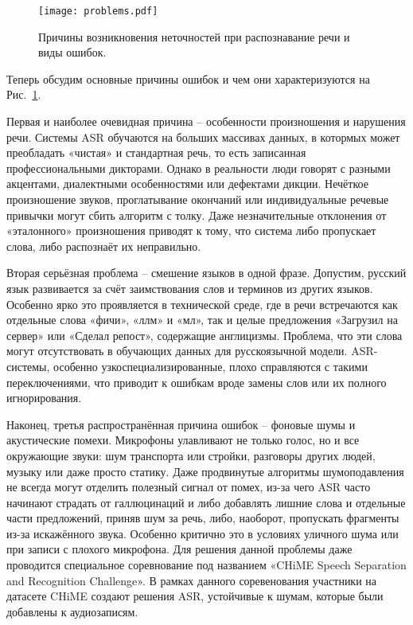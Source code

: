 \begin{figure}[!t]
  \centering
  \texttt{[image: problems.pdf]}
  \caption{Причины возникновения неточностей при распознавание речи и виды ошибок.}
  \label{fig:problems}
\end{figure}

Теперь обсудим основные причины ошибок и чем они характеризуются на Рис.~\ref{fig:problems}.

Первая и наиболее очевидная причина -- особенности произношения и нарушения речи.
Системы ASR обучаются на больших массивах данных, в котормых может преобладать «чистая» и стандартная речь, то есть записанная профессиональными дикторами.
Однако в реальности люди говорят с разными акцентами, диалектными особенностями или дефектами дикции.
Нечёткое произношение звуков, проглатывание окончаний или индивидуальные речевые привычки могут сбить алгоритм с толку.
Даже незначительные отклонения от «эталонного» произношения приводят к тому, что система либо пропускает слова, либо распознаёт их неправильно.

Вторая серьёзная проблема -- смешение языков в одной фразе.
Допустим, русский язык развивается за счёт заимствования слов и терминов из других языков.
Особенно ярко это проявляется в технической среде, где в речи встречаются как отдельные слова «фичи», «ллм» и «мл», так и целые предложения «Загрузил на сервер» или «Сделал репост», содержащие англицизмы.
Проблема, что эти слова могут отсутствовать в обучающих данных для русскоязычной модели.
ASR-системы, особенно узкоспециализированные, плохо справляются с такими переключениями, что приводит к ошибкам вроде замены слов или их полного игнорирования.

Наконец, третья распространённая причина ошибок -- фоновые шумы и акустические помехи.
Микрофоны улавливают не только голос, но и все окружающие звуки: шум транспорта или стройки, разговоры других людей, музыку или даже просто статику.
Даже продвинутые алгоритмы шумоподавления не всегда могут отделить полезный сигнал от помех, из-за чего ASR часто начинают страдать от галлюцинаций и либо добавлять лишние слова и отдельные части предложений, приняв шум за речь, либо, наоборот, пропускать фрагменты из-за искажённого звука.
Особенно критично это в условиях уличного шума или при записи с плохого микрофона.
Для решения данной проблемы даже проводится специальное соревнование под названием «CHiME Speech Separation and Recognition Challenge».
В рамках данного соревенования участники на датасете CHiME создают решения ASR, устойчивые к шумам, которые были добавлены к аудиозаписям.

